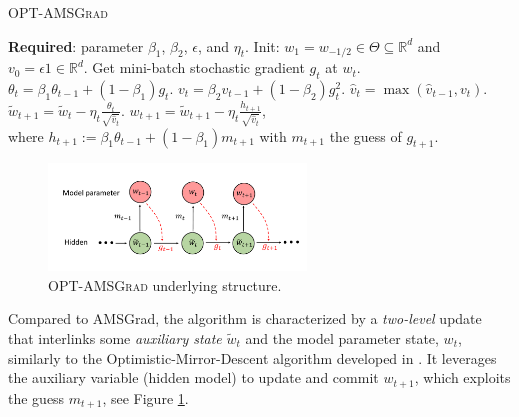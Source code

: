 \documentclass[wcp]{jmlr}
\begin{document}
\hspace{-0.2in}\begin{minipage}{0.5\linewidth}
\begin{algorithm}[H]
\begin{algorithmic}[1] 
\small
\caption{\textsc{OPT-AMSGrad}} \label{alg:optamsgrad}
\STATE \textbf{Required}: parameter $\beta_1$, $\beta_2$, $\epsilon$, and $\eta_t$. 
\STATE Init: $w_1 = w_{-1/2} \in \Theta \subseteq \mathbb R^d $ and $v_{0} = \epsilon 1 \in \mathbb R^{d}$.
\STATE Get mini-batch stochastic gradient $g_t$ at $w_t$.
\STATE $\theta_t = \beta_{1} \theta_{t-1} + (1 - \beta_{1}) g_t$.
\STATE $v_t = \beta_2 v_{t-1} + (1 - \beta_2) g_t^{2}$.
\STATE $\hat{v}_t = \max( \hat{v}_{t-1} , v_t )$. 
\STATE $\tilde{w}_{t+1} =  \tilde{w}_{t} - \eta_t \frac{\theta_t}{ \sqrt{\hat{v}_t }  } $.
\STATE $w_{t+1} = \tilde{w}_{t+1} - \eta_{t} \frac{h_{t+1}}{ \sqrt{\hat{v}_t } } $,  \\  
where $h_{t+1}:= \beta_{1} \theta_{t-1} + (1 - \beta_{1}) m_{t+1}$ with $m_{t+1}$ the guess of $g_{t+1}$. 
\ENDFOR 
\end{algorithmic}
\end{algorithm}\end{minipage}
\hfill
\begin{minipage}{0.5\linewidth}
\begin{figure}[H]
\captionsetup{justification=centering}
    \vspace{-0.1in}
    \includegraphics[width=2.7in]{plots/plot.pdf}
        \vspace{-0.1in}
    \caption{\textsc{OPT-AMSGrad} underlying structure.}
     \label{fig:scheme}
\end{figure}
\end{minipage}

\vspace{0.1in}
Compared to AMSGrad, the algorithm is characterized by a \emph{two-level} update that interlinks some \emph{auxiliary state} $\tilde{w}_{t}$ and the model parameter state, $w_t$, similarly to the Optimistic-Mirror-Descent algorithm developed in \citep{RS13b}.
It leverages the auxiliary variable (hidden model) to update and commit $w_{t+1}$, which exploits the guess $m_{t+1}$, see Figure \ref{fig:scheme}.
\end{document}
